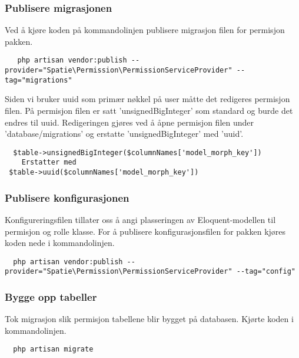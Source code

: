 \subsubsection{Publisere migrasjonen}
Ved å kjøre koden på kommandolinjen publisere migrasjon filen for permisjon pakken.
\begin{lstlisting}
   php artisan vendor:publish --provider="Spatie\Permission\PermissionServiceProvider" --tag="migrations" 
\end{lstlisting}

Siden vi bruker uuid som primær nøkkel på user måtte det redigeres permisjon filen. På permisjon filen er satt 'unsignedBigInteger' som standard og burde det  endres  til uuid. Redigeringen gjøres ved å åpne permisjon filen  under 'database/migrations' og erstatte 'unsignedBigInteger' med 'uuid'.
\begin{lstlisting}
  $table->unsignedBigInteger($columnNames['model_morph_key'])
    Erstatter med 
 $table->uuid($columnNames['model_morph_key'])
\end{lstlisting}

\subsubsection{Publisere konfigurasjonen}
Konfigureringsfilen tillater oss å angi plasseringen av Eloquent-modellen til permisjon og rolle klasse.
For å publisere konfigurasjonsfilen for pakken kjøres koden nede i kommandolinjen.

\begin{lstlisting}
  php artisan vendor:publish --provider="Spatie\Permission\PermissionServiceProvider" --tag="config"
\end{lstlisting}

\subsubsection{Bygge opp tabeller}
Tok migrasjon slik permisjon tabellene blir bygget på databasen.
Kjørte koden i kommandolinjen.
\begin{lstlisting}
  php artisan migrate
\end{lstlisting}



\clearpage
